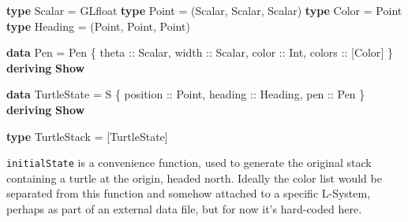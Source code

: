 \documentclass[]{article}
\newenvironment{Shaded}{}{}
\newcommand{\KeywordTok}[1]{\textcolor[rgb]{0.00,0.44,0.13}{\textbf{{#1}}}}
\newcommand{\DataTypeTok}[1]{\textcolor[rgb]{0.56,0.13,0.00}{{#1}}}
\newcommand{\OtherTok}[1]{\textcolor[rgb]{0.00,0.44,0.13}{{#1}}}
\newcommand{\FunctionTok}[1]{\textcolor[rgb]{0.02,0.16,0.49}{{#1}}}
\newcommand{\NormalTok}[1]{{#1}}
\begin{document}
\begin{Shaded}
\begin{Highlighting}[]
\KeywordTok{type} \DataTypeTok{Scalar} \FunctionTok{=} \DataTypeTok{GLfloat}
\KeywordTok{type} \DataTypeTok{Point} \FunctionTok{=} \NormalTok{(}\DataTypeTok{Scalar}\NormalTok{, }\DataTypeTok{Scalar}\NormalTok{, }\DataTypeTok{Scalar}\NormalTok{)}
\KeywordTok{type} \DataTypeTok{Color} \FunctionTok{=} \DataTypeTok{Point}
\KeywordTok{type} \DataTypeTok{Heading} \FunctionTok{=} \NormalTok{(}\DataTypeTok{Point}\NormalTok{, }\DataTypeTok{Point}\NormalTok{, }\DataTypeTok{Point}\NormalTok{)}
\end{Highlighting}
\end{Shaded}
\begin{Shaded}
\begin{Highlighting}[]
\KeywordTok{data} \DataTypeTok{Pen} \FunctionTok{=} \DataTypeTok{Pen} \NormalTok{\{}
\OtherTok{      theta  ::} \DataTypeTok{Scalar}\NormalTok{,}
\OtherTok{      width  ::} \DataTypeTok{Scalar}\NormalTok{,}
\OtherTok{      color  ::} \DataTypeTok{Int}\NormalTok{,}
\OtherTok{      colors ::} \NormalTok{[}\DataTypeTok{Color}\NormalTok{]}
      \NormalTok{\} }\KeywordTok{deriving} \KeywordTok{Show}
\end{Highlighting}
\end{Shaded}
\begin{Shaded}
\begin{Highlighting}[]
\KeywordTok{data} \DataTypeTok{TurtleState} \FunctionTok{=} \DataTypeTok{S} \NormalTok{\{}
\OtherTok{      position ::} \DataTypeTok{Point}\NormalTok{,}
\OtherTok{      heading  ::} \DataTypeTok{Heading}\NormalTok{,}
\OtherTok{      pen      ::} \DataTypeTok{Pen}
    \NormalTok{\} }\KeywordTok{deriving} \KeywordTok{Show}
\end{Highlighting}
\end{Shaded}
\begin{Shaded}
\begin{Highlighting}[]
\KeywordTok{type} \DataTypeTok{TurtleStack} \FunctionTok{=} \NormalTok{[}\DataTypeTok{TurtleState}\NormalTok{]}
\end{Highlighting}
\end{Shaded}
\texttt{initialState} is a convenience function, used to generate the
original stack containing a turtle at the origin, headed north. Ideally
the color list would be separated from this function and somehow
attached to a specific L-System, perhaps as part of an external data
file, but for now it's hard-coded here.
\end{document}
